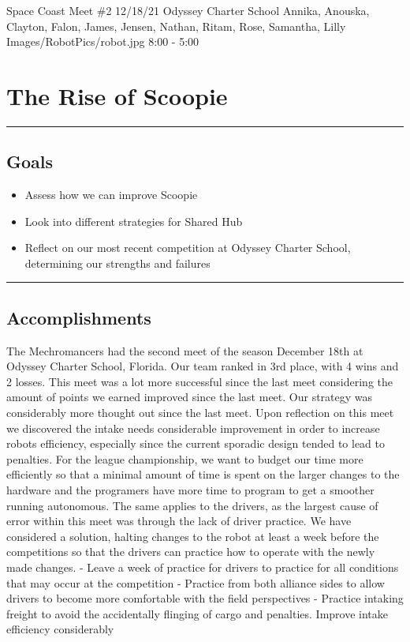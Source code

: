 \insertmeeting 
	{Space Coast Meet \#2} 
	{12/18/21}
	{Odyssey Charter School}
	{Annika, Anouska, Clayton, Falon, James, Jensen, Nathan, Ritam, Rose, Samantha, Lilly}
	{Images/RobotPics/robot.jpg}
	{8:00 - 5:00}
	
\section*{The Rise of Scoopie}
\noindent\hfil\rule{\textwidth}{.4pt}\hfil
\subsection*{Goals}
\begin{itemize}
    \item Assess how we can improve Scoopie
    \item Look into different strategies for Shared Hub
    \item Reflect on our most recent competition at Odyssey Charter School, determining our strengths and failures

\end{itemize} 

\noindent\hfil\rule{\textwidth}{.4pt}\hfil

\subsection*{Accomplishments}
The Mechromancers had the second meet of the season December 18th at Odyssey Charter School, Florida. Our team ranked in 3rd place, with 4 wins and 2 losses. This meet was a lot more successful since the last meet considering the amount of points we earned improved since the last meet. Our strategy was considerably more thought out since the last meet. Upon reflection on this meet we discovered the intake needs considerable improvement in order to increase robots efficiency, especially since the current sporadic design tended to lead to penalties.  For the league championship, we want to budget our time more efficiently so that a minimal amount of time is spent on the larger changes to the hardware and the programers have more time to program to get a smoother running autonomous. The same applies to the drivers, as the largest cause of error within this meet was through the lack of driver practice. We have considered a solution, halting changes to the robot at least a week before the competitions so that the drivers can practice how to operate with the newly made changes.  
- Leave a week of practice for drivers to practice for all conditions that may occur at the competition
- Practice from both alliance sides to allow drivers to become more comfortable with the field perspectives
- Practice intaking freight to avoid the accidentally flinging of cargo and penalties. 
Improve intake efficiency considerably 

